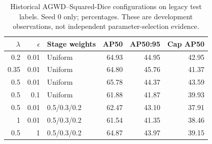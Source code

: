 \begin{table}[!t]
\centering\caption{Historical AGWD--Squared-Dice configurations on legacy test labels. Seed 0 only; percentages. These are development observations, not independent parameter-selection evidence.}
\label{tab:sweep}\footnotesize\setlength{\tabcolsep}{3pt}
\begin{tabular}{rrlrrr}\toprule
$\lambda$ & $\epsilon$ & Stage weights & AP50 & AP50:95 & Cap AP50\\\midrule
0.2 & 0.01 & Uniform & 64.93 & 44.95 & 42.95 \\
0.35 & 0.01 & Uniform & 64.80 & 45.76 & 41.37 \\
0.5 & 0.01 & Uniform & 65.78 & 44.37 & 43.59 \\
0.5 & 0.1 & Uniform & 61.88 & 41.87 & 39.93 \\
0.5 & 0.01 & 0.5/0.3/0.2 & 62.47 & 43.10 & 37.91 \\
1 & 0.01 & 0.5/0.3/0.2 & 61.54 & 41.35 & 38.46 \\
0.5 & 1 & 0.5/0.3/0.2 & 64.87 & 43.97 & 39.15 \\
\bottomrule\end{tabular}\end{table}
